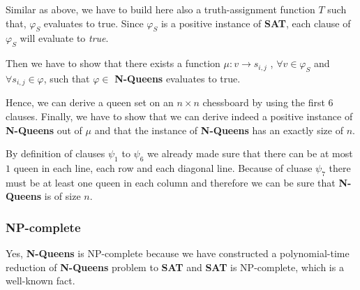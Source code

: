 Similar as above, we have to build here also a truth-assignment function $T$
such that, $\varphi _{S}$ evaluates to true. Since $\varphi _{S}$ is a
positive instance of \textbf{SAT}, each clause of $\varphi _{S}$ will
evaluate to \textit{true}.

Then we have to show that there exists a function $\mu :v\rightarrow s_{i,j}$%
, $\forall v\in \varphi _{S}$ and $\forall s_{i,j}\in \varphi $, such that $%
\varphi \in $ \textbf{N-Queens} evaluates to true.

Hence, we can derive a queen set on an $n\times n$ chessboard by using the
first 6 clauses. Finally, we have to show that we can derive indeed a
positive instance of \textbf{N-Queens} out of $\mu $ and that the instance
of \textbf{N-Queens} has an exactly size of $n$.

\newline
By definition of clauses $\psi _{1}$ to $\psi _{6}$ we already made sure
that there can be at most $1$ queen in each line, each row and each diagonal
line. Because of cluase $\psi _{7}$ there must be at least one queen in each
column and therefore we can be sure that \textbf{N-Queens} is of size $n$.

\subsubsection{NP-complete}

Yes, \textbf{N-Queens} is NP-complete because we have constructed a
polynomial-time reduction of \textbf{N-Queens} problem to \textbf{SAT} and 
\textbf{SAT} is NP-complete, which is a well-known fact.

\bigskip
